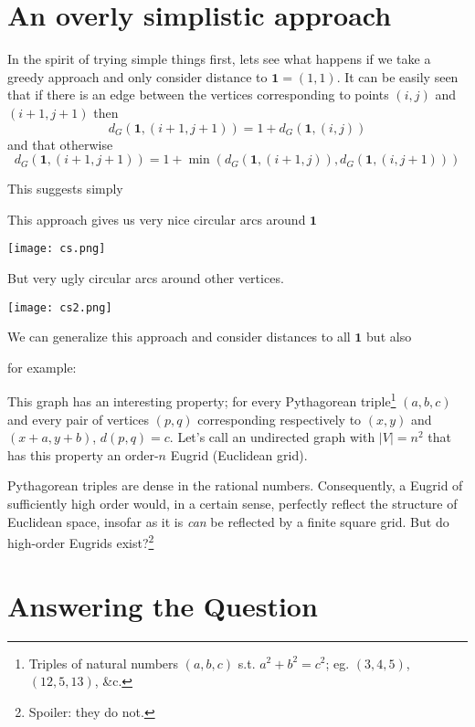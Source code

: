 \documentclass[letterpaper]{article}
\begin{document}
\section{An overly simplistic approach}

In the spirit of trying simple things first, lets see what happens if we take a greedy
approach and only consider distance to $\mathbf{1} = (1, 1)$. It can be easily seen that
if there is an edge between the vertices corresponding to points $(i, j)$ and $(i + 1, j+1)$
then
\begin{equation}
  d_G(\mathbf{1}, (i+1, j+1)) = 1 + d_G(\mathbf{1}, (i, j))
\end{equation}
and that otherwise
\begin{equation}
  d_G(\mathbf{1}, (i+1, j+1)) = 1 + \min(d_G(\mathbf{1}, (i + 1, j)),
                                         d_G(\mathbf{1}, (i, j + 1)))
\end{equation}

This suggests simply


This approach gives us very nice circular arcs around $\mathbf{1}$

\texttt{[image: cs.png]}

But very ugly circular arcs around other vertices.

\texttt{[image: cs2.png]}

We can generalize this approach and consider distances to all $\mathbf{1}$ but also

for example:

\begin{center}
  
\end{center}

This graph has an interesting property; for every Pythagorean triple\footnote{Triples of
natural numbers $(a, b, c)$ s.t. $a^2 + b^2 = c^2$; eg. $(3, 4, 5)$, $(12, 5, 13)$, \&c.}
$(a, b, c)$ and every pair of vertices $(p, q)$ corresponding respectively to $(x, y)$ and
$(x + a, y + b)$, $d(p, q) = c$. Let's call an undirected graph with $|V| = n^2$ that has
this property an order-$n$ Eugrid (Euclidean grid).

Pythagorean triples are dense in the rational numbers. Consequently, a Eugrid of sufficiently
high order would, in a certain sense, perfectly reflect the structure of Euclidean space, insofar as
it is \emph{can} be reflected by a finite square grid. But do high-order Eugrids
exist?\footnote{Spoiler: they do not.}

\section{Answering the Question}
\end{document}
